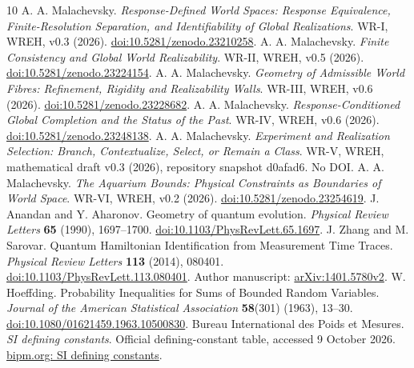 \begingroup\raggedright
\begin{thebibliography}{10}
 A. A. Malachevsky. \emph{Response-Defined World Spaces: Response Equivalence, Finite-Resolution Separation, and Identifiability of Global Realizations}. WR-I, WREH, v0.3 (2026). \href{https://doi.org/10.5281/zenodo.23210258}{doi:10.5281/zenodo.23210258}.
 A. A. Malachevsky. \emph{Finite Consistency and Global World Realizability}. WR-II, WREH, v0.5 (2026). \href{https://doi.org/10.5281/zenodo.23224154}{doi:10.5281/zenodo.23224154}.
 A. A. Malachevsky. \emph{Geometry of Admissible World Fibres: Refinement, Rigidity and Realizability Walls}. WR-III, WREH, v0.6 (2026). \href{https://doi.org/10.5281/zenodo.23228682}{doi:10.5281/zenodo.23228682}.
 A. A. Malachevsky. \emph{Response-Conditioned Global Completion and the Status of the Past}. WR-IV, WREH, v0.6 (2026). \href{https://doi.org/10.5281/zenodo.23248138}{doi:10.5281/zenodo.23248138}.
 A. A. Malachevsky. \emph{Experiment and Realization Selection: Branch, Contextualize, Select, or Remain a Class}. WR-V, WREH, mathematical draft v0.3 (2026), repository snapshot d0afad6. No DOI.
 A. A. Malachevsky. \emph{The Aquarium Bounds: Physical Constraints as Boundaries of World Space}. WR-VI, WREH, v0.2 (2026). \href{https://doi.org/10.5281/zenodo.23254619}{doi:10.5281/zenodo.23254619}.
 J. Anandan and Y. Aharonov. Geometry of quantum evolution. \emph{Physical Review Letters} \textbf{65} (1990), 1697--1700. \href{https://doi.org/10.1103/PhysRevLett.65.1697}{doi:10.1103/PhysRevLett.65.1697}.
 J. Zhang and M. Sarovar. Quantum Hamiltonian Identification from Measurement Time Traces. \emph{Physical Review Letters} \textbf{113} (2014), 080401. \href{https://doi.org/10.1103/PhysRevLett.113.080401}{doi:10.1103/PhysRevLett.113.080401}. Author manuscript: \href{https://arxiv.org/abs/1401.5780v2}{arXiv:1401.5780v2}.
 W. Hoeffding. Probability Inequalities for Sums of Bounded Random Variables. \emph{Journal of the American Statistical Association} \textbf{58}(301) (1963), 13--30. \href{https://doi.org/10.1080/01621459.1963.10500830}{doi:10.1080/01621459.1963.10500830}.
 Bureau International des Poids et Mesures. \emph{SI defining constants}. Official defining-constant table, accessed 9 October 2026. \href{https://www.bipm.org/en/measurement-units/si-defining-constants}{bipm.org: SI defining constants}.
\end{thebibliography}\endgroup
